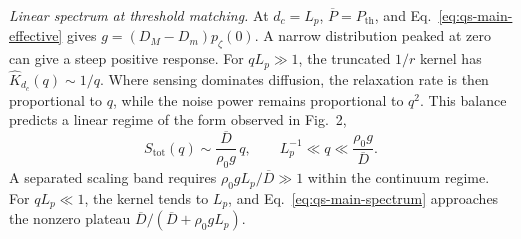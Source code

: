\documentclass[aps,prl,reprint,letterpaper,nobalancelastpage]{revtex4-2}
\begin{document}
\emph{Linear spectrum at threshold matching.} At \(d_c=L_p\), \(\overline P=P_{\mathrm{th}}\), and Eq.~\eqref{eq:qs-main-effective} gives \(g=(D_M-D_m)p_\zeta(0)\). A narrow distribution peaked at zero can give a steep positive response. For \(qL_p\gg1\), the truncated \(1/r\) kernel has \(\widehat K_{d_c}(q)\sim 1/q\). Where sensing dominates diffusion, the relaxation rate is then proportional to \(q\), while the noise power remains proportional to \(q^2\). This balance predicts a linear regime of the form observed in Fig.~2,
\begin{equation}
 S_{\mathrm{tot}}(q)\sim\frac{\overline D}{\rho_0g}\,q,
 \qquad L_p^{-1}\ll q\ll\frac{\rho_0g}{\overline D}.
 \label{eq:qs-main-linear}
\end{equation}
A separated scaling band requires \(\rho_0gL_p/\overline D\gg1\) within the continuum regime. For \(qL_p\ll1\), the kernel tends to \(L_p\), and Eq.~\eqref{eq:qs-main-spectrum} approaches the nonzero plateau \(\overline D/(\overline D+\rho_0gL_p)\).
\end{document}
